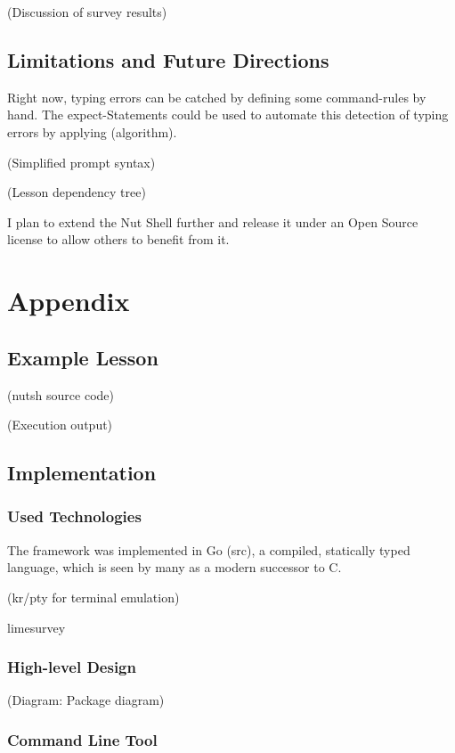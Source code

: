 \documentclass[paper=a4,abstract=on,cleardoublepage=empty,numbers=noenddot,toc=bib]{scrreprt}
\begin{document}
(Discussion of survey results)

\chapter{Limitations and Future Directions}

Right now, typing errors can be catched by defining some command-rules by hand. The expect-Statements could be used to automate this detection of typing errors by applying (algorithm).

    (Simplified prompt syntax)

    (Lesson dependency tree)

I plan to extend the Nut Shell further and release it under an Open Source license to allow others to benefit from it.

\cleardoublepage
\part*{Appendix}
\appendix

\chapter{Example Lesson}

(nutsh source code)

(Execution output)

\chapter{Implementation}

\section{Used Technologies}

The framework was implemented in Go (src), a compiled, statically typed language, which is seen by many as a modern successor to C.

(kr/pty for terminal emulation)

    limesurvey

\section{High-level Design}

(Diagram: Package diagram)

\section{Command Line Tool}
\end{document}
